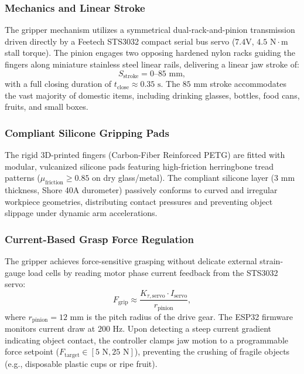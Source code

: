 \subsubsection{Mechanics and Linear Stroke}
The gripper mechanism utilizes a symmetrical dual-rack-and-pinion transmission driven directly by a Feetech STS3032 compact serial bus servo ($7.4\text{V}$, $4.5\text{ N}\cdot\text{m}$ stall torque). The pinion engages two opposing hardened nylon racks guiding the fingers along miniature stainless steel linear rails, delivering a linear jaw stroke of:
\begin{equation}
  S_{\text{stroke}} = 0\text{--}85\text{ mm},
\end{equation}
with a full closing duration of $t_{\text{close}} \approx 0.35\text{ s}$. The $85\text{ mm}$ stroke accommodates the vast majority of domestic items, including drinking glasses, bottles, food cans, fruits, and small boxes.

\subsubsection{Compliant Silicone Gripping Pads}
The rigid 3D-printed fingers (Carbon-Fiber Reinforced PETG) are fitted with modular, vulcanized silicone pads featuring high-friction herringbone tread patterns ($\mu_{\text{friction}} \ge 0.85$ on dry glass/metal). The compliant silicone layer ($3\text{ mm}$ thickness, Shore 40A durometer) passively conforms to curved and irregular workpiece geometries, distributing contact pressures and preventing object slippage under dynamic arm accelerations.

\subsubsection{Current-Based Grasp Force Regulation}
The gripper achieves force-sensitive grasping without delicate external strain-gauge load cells by reading motor phase current feedback from the STS3032 servo:
\begin{equation}
  F_{\text{grip}} \approx \frac{K_{\tau,\text{servo}} \cdot I_{\text{servo}}}{r_{\text{pinion}}},
\end{equation}
where $r_{\text{pinion}} = 12\text{ mm}$ is the pitch radius of the drive gear. The ESP32 firmware monitors current draw at $200\text{ Hz}$. Upon detecting a steep current gradient indicating object contact, the controller clamps jaw motion to a programmable force setpoint ($F_{\text{target}} \in [5\text{ N}, 25\text{ N}]$), preventing the crushing of fragile objects (e.g., disposable plastic cups or ripe fruit).

